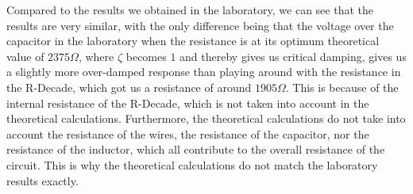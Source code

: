 Compared to the results we obtained in the laboratory, we can see that the results are very similar, with the only difference being that the voltage over the capacitor in the laboratory when the resistance is at its optimum theoretical value of
$2375\Omega$, where $\zeta$ becomes $1$ and thereby gives us critical damping, gives us a slightly more over-damped response than playing around with the resistance in the R-Decade, which got us a resistance of around $1905\Omega$. This is because of the internal resistance of the R-Decade, which is not taken into account in the theoretical calculations. Furthermore, the theoretical calculations do not take into account the resistance of the wires, the resistance of the capacitor, nor the resistance of the inductor, which all contribute to the overall resistance of the circuit. This is why the theoretical calculations do not match the laboratory results exactly.